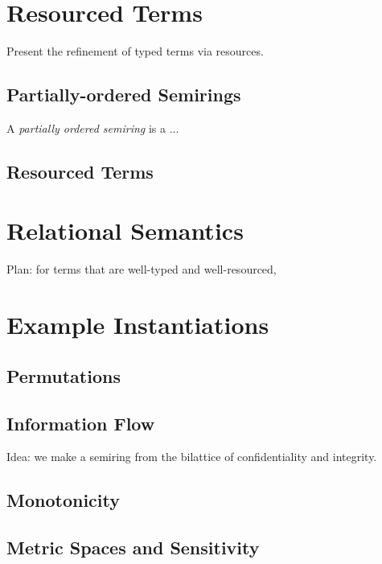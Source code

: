 \documentclass[sigplan,review]{acmart}\settopmatter{printfolios=true,printccs=false,printacmref=false}
\begin{document}
\section{Resourced Terms}

Present the refinement of typed terms via resources.

\subsection{Partially-ordered Semirings}

\begin{definition}
  A \emph{partially ordered semiring} is a ...
\end{definition}

\subsection{Resourced Terms}

\section{Relational Semantics}

Plan: for terms that are well-typed and well-resourced, 

\section{Example Instantiations}

\subsection{Permutations}

\subsection{Information Flow}

Idea: we make a semiring from the bilattice of confidentiality and
integrity.

\subsection{Monotonicity}

\subsection{Metric Spaces and Sensitivity}
\end{document}
